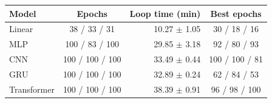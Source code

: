 \begin{tabular}{lcr c}
\toprule
Model & Epochs & Loop time (min) & Best epochs \\
\midrule
Linear & 38 / 33 / 31 & 10.27 $\pm$ 1.05 & 30 / 18 / 16 \\
MLP & 100 / 83 / 100 & 29.85 $\pm$ 3.18 & 92 / 80 / 93 \\
CNN & 100 / 100 / 100 & 33.49 $\pm$ 0.44 & 100 / 100 / 81 \\
GRU & 100 / 100 / 100 & 32.89 $\pm$ 0.24 & 62 / 84 / 53 \\
Transformer & 100 / 100 / 100 & 38.39 $\pm$ 0.91 & 96 / 98 / 100 \\
\bottomrule
\end{tabular}
